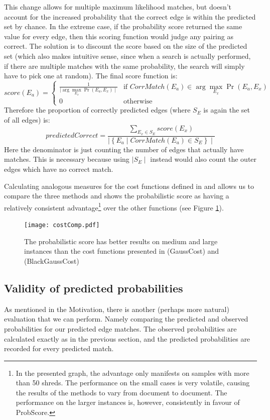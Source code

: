 This change allows for multiple maximum likelihood matches, but doesn't account for the increased probability that the correct edge is within the predicted set by chance. In the extreme case, if the probability score returned the same value for every edge, then this scoring function would judge any pairing as correct. The solution is to discount the score based on the size of the predicted set (which also makes intuitive sense, since when a search is actually performed, if there are multiple matches with the same probability, the search will simply have to pick one at random). The final score function is:
\[
score(E_a) =
\left\{
	\begin{array}{ll}
		\frac{1}{\mid \arg\max_{E_x} \Pr(E_a,E_x) \mid}  & \mbox{if } CorrMatch(E_a) \in \arg\max_{E_x} \Pr(E_a,E_x) \\
		0 & \mbox{otherwise } 
	\end{array}
\right. 
\]
Therefore the proportion of correctly predicted edges (where \(S_E\) is again the set of all edges) is:
\[
predictedCorrect = \frac{\sum_{E_x \in S_E} score(E_x)}{\mid\left\{E_a \mid CorrMatch(E_a) \in S_E\right\}\mid }
\]
Here the denominator is just counting the number of edges that actually have matches. This is necessary because using \(\mid S_E \mid \) instead would also count the outer edges which have no correct match.

Calculating analogous measures for the cost functions defined in \cite{P1} and \cite{P2} allows us to compare the three methods and shows the probabilistic score as having a relatively consistent advantage\footnote{In the presented graph, the advantage only manifests on samples with more than 50 shreds. The performance on the small cases is very volatile, causing the results of the methods to vary from document to document. The performance on the larger instances is, however, consistently in favour of ProbScore.} over the other functions (see Figure \ref{fig:costComp}).

\begin{figure}[h]
\centering
\texttt{[image: costComp.pdf]}
\caption{The probabilistic score has better results on medium and large instances than the cost functions presented in \cite{P1} (GaussCost) and \cite{P2} (BlackGaussCost)}
\label{fig:costComp}
\end{figure}

\subsection{Validity of predicted probabilities}
As mentioned in the Motivation, there is another (perhaps more natural) evaluation that we can perform. Namely comparing the predicted and observed probabilities for our predicted edge matches. The observed probabilities are calculated exactly as in the previous section, and the predicted probabilities are recorded for every predicted match. 

